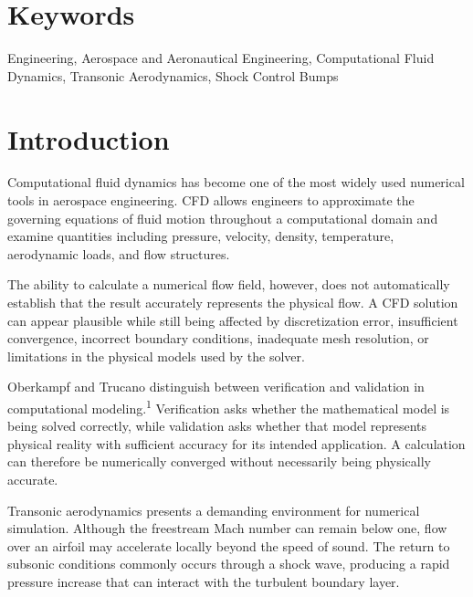\documentclass[10pt]{article}
\newcommand{\supercite}[1]{\textsuperscript{#1}}
\begin{document}

\section{Keywords}

Engineering,
Aerospace and Aeronautical Engineering,
Computational Fluid Dynamics,
Transonic Aerodynamics,
Shock Control Bumps


\section{Introduction}

Computational fluid dynamics has become one of the most widely used
numerical tools in aerospace engineering. CFD allows engineers to
approximate the governing equations of fluid motion throughout a
computational domain and examine quantities including pressure,
velocity, density, temperature, aerodynamic loads, and flow structures.

The ability to calculate a numerical flow field, however, does not
automatically establish that the result accurately represents the
physical flow. A CFD solution can appear plausible while still being
affected by discretization error, insufficient convergence, incorrect
boundary conditions, inadequate mesh resolution, or limitations in the
physical models used by the solver.

Oberkampf and Trucano distinguish between verification and validation
in computational modeling.\supercite{1} Verification asks whether the
mathematical model is being solved correctly, while validation asks
whether that model represents physical reality with sufficient accuracy
for its intended application. A calculation can therefore be
numerically converged without necessarily being physically accurate.

Transonic aerodynamics presents a demanding environment for numerical
simulation. Although the freestream Mach number can remain below one,
flow over an airfoil may accelerate locally beyond the speed of sound.
The return to subsonic conditions commonly occurs through a shock wave,
producing a rapid pressure increase that can interact with the turbulent
boundary layer.
\end{document}
